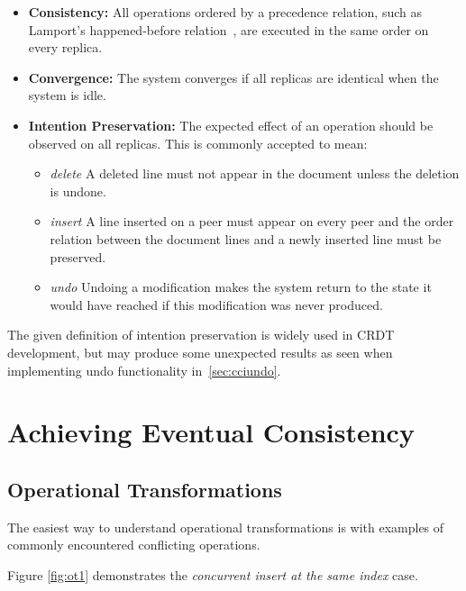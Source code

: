 \documentclass[12pt,a4paper,twoside,openright]{report}
\begin{document}
	\begin{itemize}
		\item \textbf{Consistency:} All operations ordered by a precedence relation, such as Lamport’s happened-before relation~\cite{lamport1978}, are executed in the same order on every replica.
	
		\item \textbf{Convergence:} The system converges if all replicas are identical when the system is idle.
		
		\item \textbf{Intention Preservation:} The expected effect of an operation should be observed on all replicas. This is commonly accepted to mean:

			\begin{itemize}
				\item \textit{delete}  A deleted line must not appear in the document unless the deletion is undone.
				
				\item \textit{insert}  A line inserted on a peer must appear on every peer and the order relation between the document lines and a newly inserted line must be preserved.
				
				\item  \textit{undo}  Undoing a modification makes the system return to the state it would have reached if this modification was never produced.
				
			\end{itemize}	
		
	\end{itemize}
	
	The given definition of intention preservation is widely used in CRDT development, but may produce some unexpected results as seen when implementing undo functionality in~\cref{sec:cciundo}.
	

\section{Achieving Eventual Consistency}

	\subsection{Operational Transformations}
	
	The easiest way to understand operational transformations is with examples of commonly encountered conflicting operations.
	
	Figure \ref{fig:ot1} demonstrates the \textit{concurrent insert at the same index} case.
	
\end{document}
